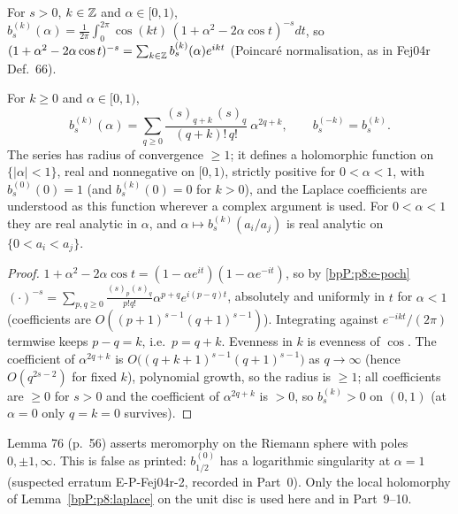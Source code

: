 \begin{definition}\label{bpP:p8:laplace-def}
For $s>0$, $k\in\mathbb{Z}$ and $\alpha\in[0,1)$,
$b_s^{(k)}(\alpha)=\frac1{2\pi}\int_0^{2\pi}\cos(kt)\,(1+\alpha^2-2\alpha\cos t)^{-s}dt$, so $(1+\alpha^2-2\alpha\cos t)^{-s}=\sum_{k\in\mathbb{Z}}b_s^{(k)}(\alpha)e^{ikt}$ (Poincar\'e normalisation, as in Fej04r Def.~66).
\end{definition}

\begin{lemma}\label{bpP:p8:laplace}
For $k\ge0$ and $\alpha\in[0,1)$,
\[b_s^{(k)}(\alpha)=\sum_{q\ge0}\frac{(s)_{q+k}\,(s)_q}{(q+k)!\,q!}\ \alpha^{2q+k},\qquad b_s^{(-k)}=b_s^{(k)}.\]
The series has radius of convergence $\ge1$; it defines a holomorphic function on $\{|\alpha|<1\}$, real and nonnegative on $[0,1)$, strictly positive for $0<\alpha<1$, with $b_s^{(0)}(0)=1$ (and $b_s^{(k)}(0)=0$ for $k>0$), and the Laplace coefficients are understood as this function wherever a complex argument is used. For $0<\alpha<1$ they are real analytic in $\alpha$, and $\alpha\mapsto b_s^{(k)}(a_i/a_j)$ is real analytic on $\{0<a_i<a_j\}$.
\end{lemma}
\begin{proof}
\label{stepP:p8:la-exp} $1+\alpha^2-2\alpha\cos t=(1-\alpha e^{it})(1-\alpha e^{-it})$, so by \ref{bpP:p8:e-poch} $(\cdot)^{-s}=\sum_{p,q\ge0}\frac{(s)_p(s)_q}{p!q!}\alpha^{p+q}e^{i(p-q)t}$, absolutely and uniformly in $t$ for $\alpha<1$ (coefficients are $O((p+1)^{s-1}(q+1)^{s-1})$). Integrating against $e^{-ikt}/(2\pi)$ termwise keeps $p-q=k$, i.e.\ $p=q+k$. Evenness in $k$ is evenness of $\cos$.
\label{stepP:p8:la-conv} The coefficient of $\alpha^{2q+k}$ is $O\big((q+k+1)^{s-1}(q+1)^{s-1}\big)$ as $q\to\infty$ (hence $O(q^{2s-2})$ for fixed $k$), polynomial growth, so the radius is $\ge1$; all coefficients are $\ge0$ for $s>0$ and the coefficient of $\alpha^{2q+k}$ is $>0$, so $b_s^{(k)}>0$ on $(0,1)$ (at $\alpha=0$ only $q=k=0$ survives).
\end{proof}
\begin{remark}\label{bpP:p8:no76}
Lemma 76 (p.~56) asserts meromorphy on the Riemann sphere with poles $0,\pm1,\infty$. This is false as printed: $b_{1/2}^{(0)}$ has a logarithmic singularity at $\alpha=1$ (suspected erratum E-P-Fej04r-2, recorded in Part~0). Only the local holomorphy of Lemma~\ref{bpP:p8:laplace} on the unit disc is used here and in Part~9--10.
\end{remark}

